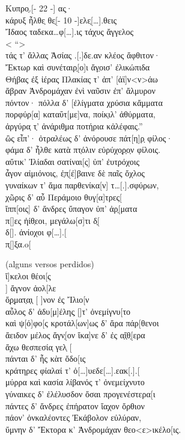 {\begin{gkverse}
Κυπρο̣.[\qquad     - 22 -\qquad       ] ας̣·\\
κάρυξ ἦλθε̣ θε̣[\qquad - 10 -\qquad  ]ελε̣[\ldots{}].θεις\\
Ἴδαος ταδεκα\ldots{}φ[\ldots{}].ις τάχυς ἄγγελος\\
< “\qquad			>\\
τάς τ’ ἄλλας Ἀσίας .[.]δε.αν κλέος ἄφθιτον·\\
Ἔκτωρ καὶ συνέταιρ̣[ο]ι ἄγ̣οισ’ ἐλικώπιδα\\
Θήβας ἐξ ἰέρας Πλακίας τ’ ἀπ’ [ἀϊ]ν<ν>άω\\
ἄβραν Ἀνδρομάχαν ἐνὶ ναῦσιν ἐπ’ ἄλμυρον\\
πόντον· πόλλα δ’ [ἐλίγματα χρύσια κἄμματα\\
πορφύρ[α] καταΰτ[με]να, ποίκ̣ιλ’ ἀθύρματα,\\
ἀργύρα̣ τ̣’ ἀνά̣ριθ̣μα ποτήρια κἀλέφαις.”\\
ὢς εἶπ’· ὀτραλέως δ’ ἀνόρουσε πάτ[η]ρ̣ φίλος·\\
φάμα δ’ ἦλθε κατὰ πτ̣όλιν εὐρύχο̣ρ̣ο̣ν φίλοις.\\
αὔτικ’ Ἰλίαδαι σατίναι[ς] ὐπ’ ἐυτρόχοις\\
ἆγον αἰμιόνοις, ἐ̣π̣[έ]βαινε δὲ παῖς ὄχλος\\
γυναίκων τ’ ἄμα παρθενίκα[ν] τ\ldots{}[.].σφύρων,\\
χῶρις δ’ αὖ Περάμοιο θυγ[α]τρες[\\
ἴππ[οις] δ’ ἄνδρες ὔπαγον ὐπ’ ἀρ̣[ματα\\
π[\qquad  ]ες ἠίθ̣εοι, μεγάλω[σ]τι δ̣[\\
δ[\qquad  ]. ἀνίοχοι φ[\ldots{}].[\\
π̣[\qquad  ]ξα.o[

\textnormal{(alguns versos perdidos)}\\
    ἴ]κελοι θέοι[ς\\
     ] ἄγνον ἀολ[λε\\
ὄ̣ρ̣ματ̣α̣ι̣ [			     ]νον ἐς Ἴλιο[ν\\
αὖλος δ’ ἀδυ[μ]έλης̣ [\qquad	    ]τ’ ὀνεμίγνυ[το\\
καὶ ψ[ό]φο[ς κροτάλ[ων\qquad    ]ως δ’ ἄρα πάρ[θενοι\\
ἄειδον μέλος ἄγν̣[ον ἴκα]νε δ’ ἐς α̣ἴ̣θ̣[ερα\\
ἄχω θεσπεσία̣ γελ̣ [\\
πάνται δ’ ἦς κὰτ ὄδο[ις\\
κράτηρες φίαλαί τ’ ὀ[\ldots{}]υεδε[\ldots{}].εακ[.].[\\
μύρρα καὶ κασία λίβανός τ’ ὀνεμείχνυτο\\
γύναικες δ’ ἐλέλυσδον ὄσαι προγενέστερα[ι\\
πάντες δ’ ἄνδρες ἐπήρατον ἴαχον ὄρθιον\\
πάον’ ὀνκαλέοντες Ἐκάβολον εὐλύραν,\\
ὔμνην δ’ Ἔκτορα κ’ Ἀνδρομάχαν θεο<ε>ικέλο[ις.	
\end{gkverse}

}
